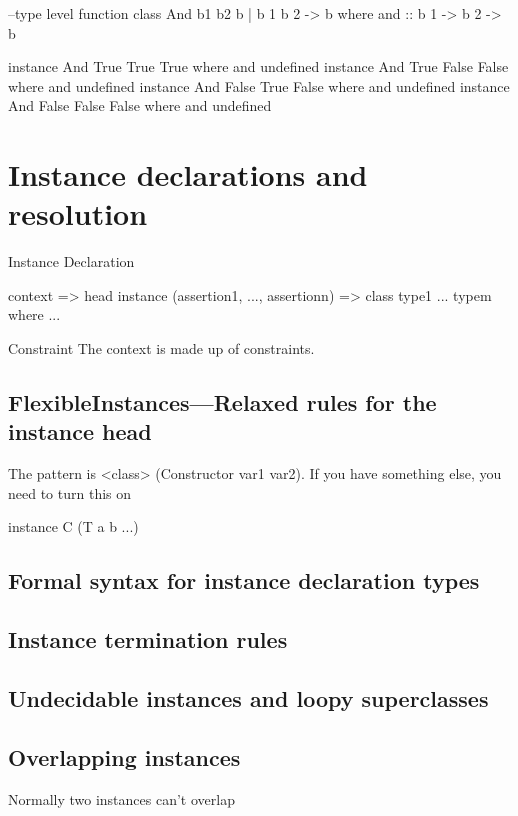 \documentclass[openany, 12pt]{book}
\begin{document}
\begin{haskell}{}
\begin{haskell}{}
--type level function
class And b1 b2 b | b 1 b 2 -> b where
    and :: b 1 -> b 2 -> b

instance And True True True    where and undefined
instance And True False False  where and undefined
instance And False True False  where and undefined
instance And False False False where and undefined
\end{haskell}

\chapter{Instance declarations and resolution}
\begin{definition}{Instance Declaration}{}
	\begin{haskell}{}
                               context => head
instance (assertion1, ..., assertionn) => class type1 ... typem where ...
    \end{haskell}
\end{definition}

\begin{definition}{Constraint}{}
	The context is made up of constraints.
\end{definition}

\section{FlexibleInstances---Relaxed rules for the instance head}
The pattern  is <class> (Constructor var1 var2). If you have something else, you
need to turn this on

\begin{haskell}{}
instance C (T a b ...)
\end{haskell}

\section{Formal syntax for instance declaration types}
\section{Instance termination rules}
\section{Undecidable instances and loopy superclasses}
\section{Overlapping instances}
Normally two instances can't overlap


\end{haskell}
\end{document}
